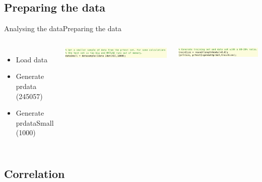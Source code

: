\documentclass{beamer}
\begin{document}
\subsection{Preparing the data}

\begin{frame}{Analysing the data}{Preparing the data}
    \begin{columns}
    \begin{itemize}
        \item Load data 
        \item Generate prdata (245057)
        \item Generate prdataSmall (1000)
    \end{itemize}
        \includegraphics[scale=0.3]{smalldata.png}
        
        \includegraphics[scale=0.30]{training.png}
    \end{columns}
\end{frame}

%

\subsection{Correlation}
\end{document}
